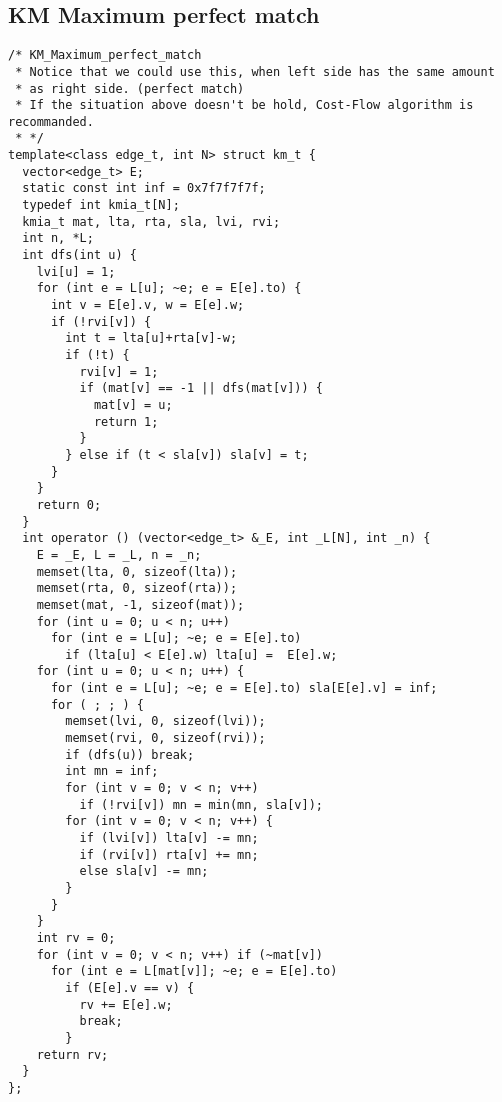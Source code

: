 \subsection{KM Maximum perfect match}
\begin{lstlisting}
/* KM_Maximum_perfect_match
 * Notice that we could use this, when left side has the same amount
 * as right side. (perfect match)
 * If the situation above doesn't be hold, Cost-Flow algorithm is recommanded.
 * */
template<class edge_t, int N> struct km_t {
  vector<edge_t> E;
  static const int inf = 0x7f7f7f7f;
  typedef int kmia_t[N];
  kmia_t mat, lta, rta, sla, lvi, rvi;
  int n, *L;
  int dfs(int u) {
    lvi[u] = 1;
    for (int e = L[u]; ~e; e = E[e].to) {
      int v = E[e].v, w = E[e].w;
      if (!rvi[v]) {
        int t = lta[u]+rta[v]-w;
        if (!t) {
          rvi[v] = 1;
          if (mat[v] == -1 || dfs(mat[v])) {
            mat[v] = u;
            return 1;
          }
        } else if (t < sla[v]) sla[v] = t;
      }
    }
    return 0;
  }
  int operator () (vector<edge_t> &_E, int _L[N], int _n) {
    E = _E, L = _L, n = _n;
    memset(lta, 0, sizeof(lta));
    memset(rta, 0, sizeof(rta));
    memset(mat, -1, sizeof(mat));
    for (int u = 0; u < n; u++)
      for (int e = L[u]; ~e; e = E[e].to)
        if (lta[u] < E[e].w) lta[u] =  E[e].w;
    for (int u = 0; u < n; u++) {
      for (int e = L[u]; ~e; e = E[e].to) sla[E[e].v] = inf;
      for ( ; ; ) {
        memset(lvi, 0, sizeof(lvi));
        memset(rvi, 0, sizeof(rvi));
        if (dfs(u)) break;
        int mn = inf;
        for (int v = 0; v < n; v++)
          if (!rvi[v]) mn = min(mn, sla[v]);
        for (int v = 0; v < n; v++) {
          if (lvi[v]) lta[v] -= mn;
          if (rvi[v]) rta[v] += mn;
          else sla[v] -= mn;
        }
      }
    }
    int rv = 0;
    for (int v = 0; v < n; v++) if (~mat[v])
      for (int e = L[mat[v]]; ~e; e = E[e].to)
        if (E[e].v == v) {
          rv += E[e].w;
          break;
        }
    return rv;
  }
};
\end{lstlisting}


